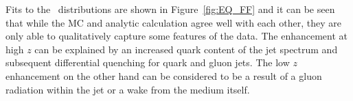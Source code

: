 
Fits to the \Dz\ distributions are shown in Figure~\ref{fig:EQ_FF} and it can be seen that while the MC and analytic calculation agree well with each other, they are only able to qualitatively capture some features of the data.
The enhancement at high $z$ can be explained by an increased quark content of the jet spectrum and subsequent differential quenching for quark and gluon jets.
The low $z$ enhancement on the other hand can be considered to be a result of a gluon radiation within the jet or a wake from the medium itself.

